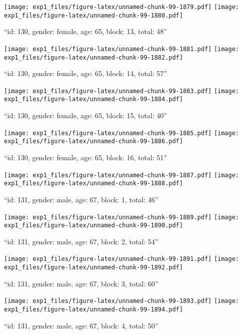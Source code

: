\documentclass[,]{article}
\begin{document}
\texttt{[image: exp1\_files/figure-latex/unnamed-chunk-99-1879.pdf]}
\texttt{[image: exp1\_files/figure-latex/unnamed-chunk-99-1880.pdf]}

\newpage
[1] 

``id: 130, gender: female, age: 65, block: 13, total: 48''

\texttt{[image: exp1\_files/figure-latex/unnamed-chunk-99-1881.pdf]}
\texttt{[image: exp1\_files/figure-latex/unnamed-chunk-99-1882.pdf]}

\newpage
[1] 

``id: 130, gender: female, age: 65, block: 14, total: 57''

\texttt{[image: exp1\_files/figure-latex/unnamed-chunk-99-1883.pdf]}
\texttt{[image: exp1\_files/figure-latex/unnamed-chunk-99-1884.pdf]}

\newpage
[1] 

``id: 130, gender: female, age: 65, block: 15, total: 40''

\texttt{[image: exp1\_files/figure-latex/unnamed-chunk-99-1885.pdf]}
\texttt{[image: exp1\_files/figure-latex/unnamed-chunk-99-1886.pdf]}

\newpage
[1] 

``id: 130, gender: female, age: 65, block: 16, total: 51''

\texttt{[image: exp1\_files/figure-latex/unnamed-chunk-99-1887.pdf]}
\texttt{[image: exp1\_files/figure-latex/unnamed-chunk-99-1888.pdf]}

\newpage
[1] 

``id: 131, gender: male, age: 67, block: 1, total: 46''

\texttt{[image: exp1\_files/figure-latex/unnamed-chunk-99-1889.pdf]}
\texttt{[image: exp1\_files/figure-latex/unnamed-chunk-99-1890.pdf]}

\newpage
[1] 

``id: 131, gender: male, age: 67, block: 2, total: 54''

\texttt{[image: exp1\_files/figure-latex/unnamed-chunk-99-1891.pdf]}
\texttt{[image: exp1\_files/figure-latex/unnamed-chunk-99-1892.pdf]}

\newpage
[1] 

``id: 131, gender: male, age: 67, block: 3, total: 60''

\texttt{[image: exp1\_files/figure-latex/unnamed-chunk-99-1893.pdf]}
\texttt{[image: exp1\_files/figure-latex/unnamed-chunk-99-1894.pdf]}

\newpage
[1] 

``id: 131, gender: male, age: 67, block: 4, total: 50''
\end{document}
